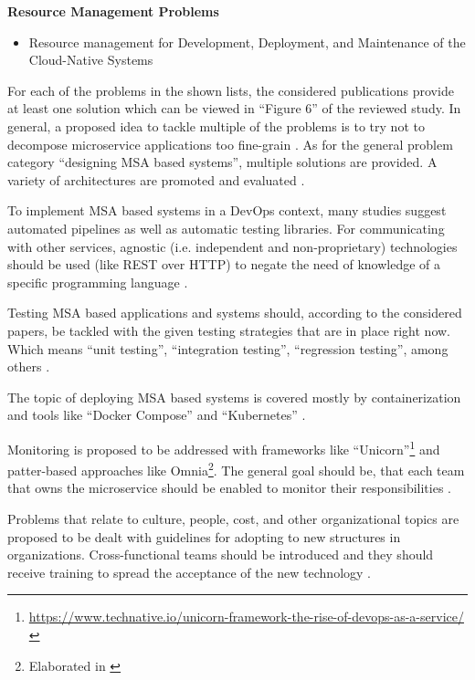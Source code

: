 \textbf{Resource Management Problems}
\begin{itemize}
    \item Resource management for Development, Deployment,
          and Maintenance of the Cloud-Native Systems
\end{itemize}

For each of the problems in the shown lists, the considered publications
provide at least one solution which can be viewed in ``Figure 6''
of the reviewed study. In general, a proposed idea to tackle multiple
of the problems is to try not to decompose microservice applications
too fine-grain \cite{waseem:SMSMSADevOps}. As for the general problem
category ``designing MSA based systems'', multiple solutions are provided.
A variety of architectures are promoted and evaluated \cite{waseem:SMSMSADevOps}.

To implement MSA based systems in a DevOps context, many studies suggest
automated pipelines as well as automatic testing libraries. For communicating
with other services, agnostic (i.e. independent and non-proprietary)
technologies should be used (like REST over HTTP)
to negate the need of knowledge of a specific programming language
\cite{waseem:SMSMSADevOps}.

Testing MSA based applications and systems should, according to the considered
papers, be tackled with the given testing strategies that are in place
right now. Which means ``unit testing'', ``integration testing'',
``regression testing'', among others \cite{waseem:SMSMSADevOps}.

The topic of deploying MSA based systems is covered mostly by containerization
and tools like ``Docker Compose'' and ``Kubernetes'' \cite{waseem:SMSMSADevOps}.

Monitoring is proposed to be addressed with frameworks like
``Unicorn''\footnote{\url{https://www.technative.io/unicorn-framework-the-rise-of-devops-as-a-service/}}
and patter-based approaches like Omnia\footnote{Elaborated in \cite{miglerina:Omnia}}.
The general goal should be, that each team that owns the microservice should be enabled
to monitor their responsibilities \cite{waseem:SMSMSADevOps}.

Problems that relate to culture, people, cost, and other organizational
topics are proposed to be dealt with guidelines for adopting to
new structures in organizations. Cross-functional teams should be introduced
and they should receive training to spread the acceptance of the
new technology \cite{waseem:SMSMSADevOps}.

